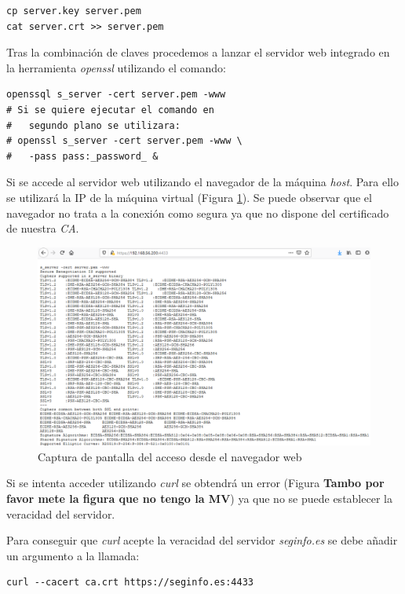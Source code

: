 \documentclass[10pt,a4paper]{article}
\begin{document}
\begin{lstlisting}
cp server.key server.pem
cat server.crt >> server.pem
\end{lstlisting}

Tras la combinación de claves procedemos a lanzar el servidor web integrado en la herramienta \emph{openssl} utilizando el comando:

\begin{lstlisting}
openssql s_server -cert server.pem -www
# Si se quiere ejecutar el comando en 
#	segundo plano se utilizara:
# openssl s_server -cert server.pem -www \ 
#	-pass pass:_password_ &
\end{lstlisting}

Si se accede al servidor web utilizando el navegador de la máquina \emph{host}. Para ello se utilizará la IP de la máquina virtual (Figura \ref{fig:tarea3_paso2}). Se puede observar que el navegador no trata a la conexión como segura ya que no dispone del certificado de nuestra \emph{CA}.

\begin{figure}[h!]
\centering
\includegraphics[scale=0.4]{images/tarea3_paso2.png}
\caption{Captura de pantalla del acceso desde el navegador web}
\label{fig:tarea3_paso2}
\end{figure}

Si se intenta acceder utilizando \emph{curl} se obtendrá un error (Figura \textbf{{\LARGE Tambo por favor mete la figura que no tengo la MV}}) ya que no se puede establecer la veracidad del servidor.


Para conseguir que \emph{curl} acepte la veracidad del servidor \emph{seginfo.es} se debe añadir un argumento a la llamada:

\begin{lstlisting}
curl --cacert ca.crt https://seginfo.es:4433
\end{lstlisting}
\end{document}
